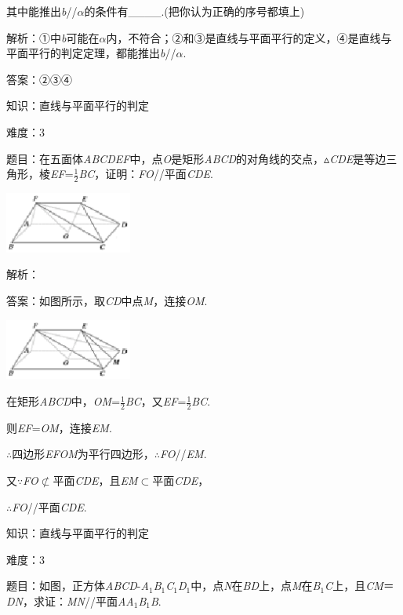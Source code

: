 \documentclass{article} %
\begin{document}
其中能推出\textit{b}//\textit{$\alpha$}的条件有\_\_\_\_.(把你认为正确的序号都填上)

解析：①中\textit{b}可能在\textit{$\alpha$}内，不符合；②和③是直线与平面平行的定义，④是直线与平面平行的判定定理，都能推出\textit{b}//\textit{$\alpha$}.

答案：②③④

知识：直线与平面平行的判定

难度：3

题目：在五面体\textit{ABCDEF}中，点\textit{O}是矩形\textit{ABCD}的对角线的交点，$\mathrm{\vartriangle}$\textit{CDE}是等边三角形，棱\textit{EF}=$\frac{1}{2}$\textit{BC}，证明：\textit{FO}//平面\textit{CDE}.

\includegraphics*[width=1.65in, height=0.79in, keepaspectratio=false]{image140}

解析：

答案：如图所示，取\textit{CD}中点\textit{M}，连接\textit{OM}.

\includegraphics*[width=1.65in, height=0.79in, keepaspectratio=false]{image141}

在矩形\textit{ABCD}中，\textit{OM}=$\frac{1}{2}$\textit{BC}，又\textit{EF}=$\frac{1}{2}$\textit{BC}.

则\textit{EF}=\textit{OM}，连接\textit{EM}.

$\mathrm{\therefore}$四边形\textit{EFOM}为平行四边形，$\mathrm{\therefore}$\textit{FO}//\textit{EM}.

又$\mathrm{\because}$\textit{FO}$\mathrm{\nsubset}$平面\textit{CDE}，且\textit{EM}$\mathrm{\subset }$平面\textit{CDE}，

$\mathrm{\therefore}$\textit{FO}//平面\textit{CDE}.

知识：直线与平面平行的判定

难度：3

题目：如图，正方体\textit{ABCD}-\textit{A}${}_{1}$\textit{B}${}_{1}$\textit{C}${}_{1}$\textit{D}${}_{1}$中，点\textit{N}在\textit{BD}上，点\textit{M}在\textit{B}${}_{1}$\textit{C}上，且\textit{CM}＝\textit{DN}，求证：\textit{MN}//平面\textit{AA}${}_{1}$\textit{B}${}_{1}$\textit{B}.
\end{document}
